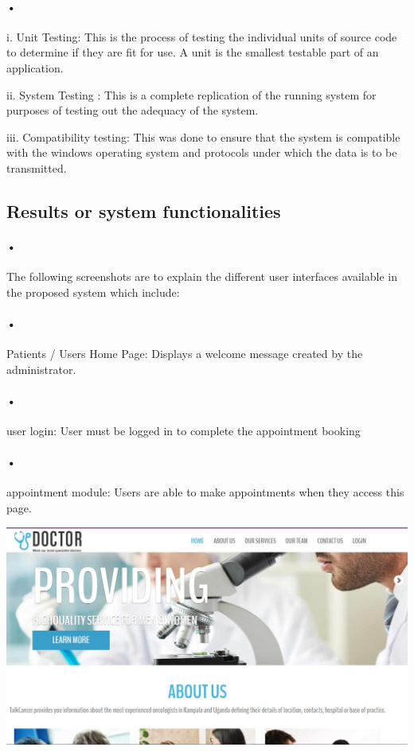 \documentclass[12pt]{article}
\begin{document}
\paragraph{•}i.	 Unit Testing: This is the process of testing the individual units of source code to determine if they are fit for use. A unit is the smallest testable part of an application.

ii.	System Testing : This is a complete replication of the running system for purposes of testing out the adequacy of the system. 

iii.	Compatibility testing: This was done to ensure that the system is compatible with the windows operating system and protocols under which the data is to be transmitted. 

\subsection{Results or system functionalities}
\paragraph{•}The following screenshots are to explain the different user interfaces available in the proposed system which include: 

\paragraph{•}Patients / Users Home Page: Displays a welcome message created by the administrator.

\paragraph{•}user login: User must be logged in to complete the appointment booking

\paragraph{•}appointment module: Users are able to make appointments when they access this page.


\begin{center}
\includegraphics[scale=0.6]{home}
\end{center}
\end{document}
